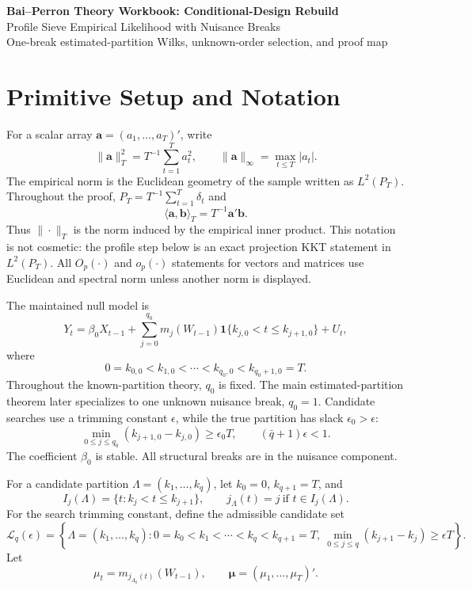 \documentclass[12pt]{article}
\numberwithin{equation}{section}
\theoremstyle{definition}
\newcommand{\ind}{\mathbf 1}
\begin{document}
\begin{center}
{\Large\bf Bai--Perron Theory Workbook: Conditional-Design Rebuild}\\[6pt]
{\large Profile Sieve Empirical Likelihood with Nuisance Breaks}\\[6pt]
{\normalsize One-break estimated-partition Wilks, unknown-order selection, and proof map}
\end{center}

\tableofcontents
\newpage

\section{Primitive Setup and Notation}

For a scalar array \(\bm a=(a_1,\ldots,a_T)'\), write
\[
    \|\bm a\|_T^2=T^{-1}\sum_{t=1}^T a_t^2,
    \qquad
    \|\bm a\|_\infty=\max_{t\leq T}|a_t|.
\]
The empirical norm is the Euclidean geometry of the sample written as
\(L^2(P_T)\).  Throughout the proof, \(P_T=T^{-1}\sum_{t=1}^T\delta_t\) and
\[
    \langle \bm a,\bm b\rangle_T=T^{-1}\bm a'\bm b.
\]
Thus \(\|\cdot\|_T\) is the norm induced by the empirical inner product.  This
notation is not cosmetic: the profile step below is an exact projection KKT
statement in \(L^2(P_T)\).
All \(O_p(\cdot)\) and \(o_p(\cdot)\) statements for vectors and matrices use Euclidean and spectral norm unless another norm is displayed.

The maintained null model is
\begin{equation}
    Y_t
    =
    \beta_0X_{t-1}
    +
    \sum_{j=0}^{q_0}
    m_j(W_{t-1})\ind\{k_{j,0}<t\leq k_{j+1,0}\}
    +
    U_t,
    \label{eq:primitive-model}
\end{equation}
where
\[
    0=k_{0,0}<k_{1,0}<\cdots<k_{q_0,0}<k_{q_0+1,0}=T.
\]
Throughout the known-partition theory, \(q_0\) is fixed.  The main
estimated-partition theorem later specializes to one unknown nuisance break,
\(q_0=1\).  Candidate searches use a trimming constant \(\epsilon\), while
the true partition has slack \(\epsilon_0>\epsilon\):
\[
    \min_{0\leq j\leq q_0}(k_{j+1,0}-k_{j,0})\geq \epsilon_0 T,
    \qquad
    (\bar q+1)\epsilon<1.
\]
The coefficient \(\beta_0\) is stable. All structural breaks are in the nuisance component.

For a candidate partition \(\Lambda=(k_1,\ldots,k_q)\), let \(k_0=0\), \(k_{q+1}=T\), and
\[
    I_j(\Lambda)=\{t:k_j<t\leq k_{j+1}\},
    \qquad
    j_\Lambda(t)=j\ \text{if }t\in I_j(\Lambda).
\]
For the search trimming constant, define the admissible candidate set
\[
    \mathcal L_q(\epsilon)
    =
    \left\{\Lambda=(k_1,\ldots,k_q):
    0=k_0<k_1<\cdots<k_q<k_{q+1}=T,\ 
    \min_{0\leq j\leq q}(k_{j+1}-k_j)\geq \epsilon T
    \right\}.
\]
Let
\[
    \mu_t=m_{j_{\Lambda_0}(t)}(W_{t-1}),
    \qquad
    \bm\mu=(\mu_1,\ldots,\mu_T)'.
\]
\end{document}
